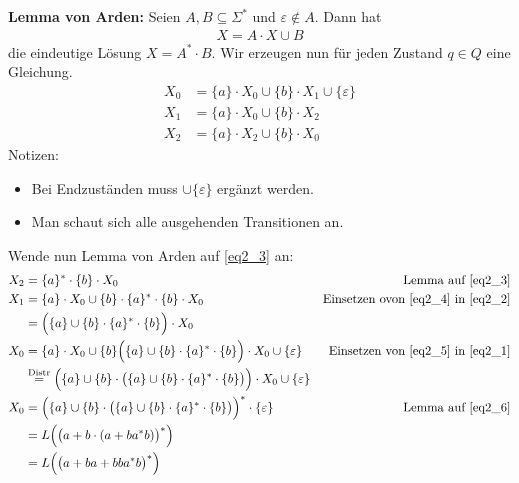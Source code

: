 \begin{lösung}
	\textbf{Lemma von Arden:}
	Seien $A,B\subseteq\Sigma^\ast$ und $\varepsilon\not\in A$.
	Dann hat
	\begin{align}\label{eqLemmaArden}\tag{Arden}
		X=A\cdot X\cup B
	\end{align}
	die eindeutige Lösung $X=A^\ast\cdot B$.\nl
	Wir erzeugen nun für jeden Zustand $q\in Q$ eine Gleichung.
	\begin{align}\label{eq2_1}
		X_0&=\lbrace a\rbrace\cdot X_0\cup\lbrace b\rbrace\cdot X_1\cup\lbrace\varepsilon\rbrace\\\label{eq2_2}
		X_1&=\lbrace a\rbrace\cdot X_0\cup\lbrace b\rbrace\cdot X_2\\
		X_2&=\lbrace a\rbrace\cdot X_2\cup\lbrace b\rbrace\cdot X_0\label{eq2_3}
	\end{align}
	Notizen:
	\begin{itemize}
		\item Bei Endzuständen muss $\cup\lbrace\varepsilon\rbrace$ ergänzt werden.
		\item Man schaut sich alle ausgehenden Transitionen an.
	\end{itemize}
	Wende nun Lemma von Arden auf \eqref{eq2_3} an:
	\begin{align}\label{eq2_4}
		X_2&=\lbrace a\rbrace^\ast\cdot\lbrace b\rbrace\cdot X_0 &\text{Lemma auf \eqref{eq2_3}}\\\nonumber
		X_1&=\lbrace a\rbrace\cdot X_0\cup\lbrace b\rbrace\cdot\lbrace a\rbrace^\ast\cdot\lbrace b\rbrace\cdot X_0 &\text{Einsetzen ovon \eqref{eq2_4} in \eqref{eq2_2}}\\
		&=\Big(\lbrace a\rbrace\cup\lbrace b\rbrace\cdot\lbrace a\rbrace^\ast\cdot\lbrace b\rbrace\Big)\cdot X_0\label{eq2_5}\\
		X_0&=\lbrace a\rbrace\cdot X_0\cup\lbrace b\rbrace\Big(\lbrace a\rbrace\cup\lbrace b\rbrace\cdot\lbrace a\rbrace^\ast\cdot\lbrace b\rbrace\Big)\cdot X_0\cup\lbrace\varepsilon\rbrace &\text{Einsetzen von \eqref{eq2_5} in \eqref{eq2_1}}\nonumber\\
		&\overset{\text{Distr}}{=}
		\Big(\lbrace a\rbrace\cup\lbrace b\rbrace\cdot\big(\lbrace a\rbrace\cup\lbrace b\rbrace\cdot\lbrace a\rbrace^\ast\cdot\lbrace b\rbrace\big)\Big)\cdot X_0\cup\lbrace\varepsilon\rbrace\label{eq2_6}\\
		X_0&=\Big(\lbrace a\rbrace\cup\lbrace b\rbrace\cdot\big(\lbrace a\rbrace\cup\lbrace b\rbrace\cdot\lbrace a\rbrace^\ast\cdot\lbrace b\rbrace\big)\Big)^\ast\cdot\lbrace\varepsilon\rbrace &\text{Lemma auf \eqref{eq2_6}}\nonumber\\
		&=L\Big(\big(a+b\cdot(a+ba^\ast b)\big)^\ast\Big)\nonumber\\
		&=L\Big(\big(a+ba+bba^\ast b\big)^\ast\Big)\nonumber
	\end{align}
\end{lösung} 

